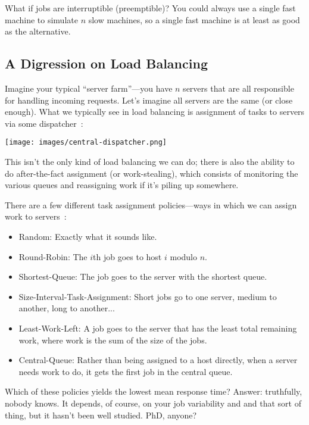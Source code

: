 What if jobs are interruptible (preemptible)? You could always use a single fast machine to simulate $n$ slow machines, so a single fast machine is at least as good as the alternative. 

\subsection*{A Digression on Load Balancing}

Imagine your typical ``server farm''---you have $n$ servers that are all responsible for handling incoming requests. Let's imagine all servers are the same (or close enough). What we typically see in load balancing is assignment of tasks to servers via some dispatcher~\cite{pmd}:

\begin{center}
	\texttt{[image: images/central-dispatcher.png]}
\end{center}

This isn't the only kind of load balancing we can do; there is also the ability to do after-the-fact assignment (or work-stealing), which consists of monitoring the various queues and reassigning work if it's piling up somewhere.

There are a few different task assignment policies---ways in which we can assign work to servers~\cite{pmd}:

\begin{itemize}
	\item Random: Exactly what it sounds like.
	\item Round-Robin: The $i$th job goes to host $i$ modulo $n$.
	\item Shortest-Queue: The job goes to the server with the shortest queue.
	\item Size-Interval-Task-Assignment: Short jobs go to one server, medium to another, long to another...
	\item Least-Work-Left: A job goes to the server that has the least total remaining work, where work is the sum of the size of the jobs.
	\item Central-Queue: Rather than being assigned to a host directly, when a server needs work to do, it gets the first job in the central queue.
\end{itemize}

Which of these policies yields the lowest mean response time? Answer: truthfully, nobody knows. It depends, of course, on your job variability and and that sort of thing, but it hasn't been well studied. PhD, anyone?

